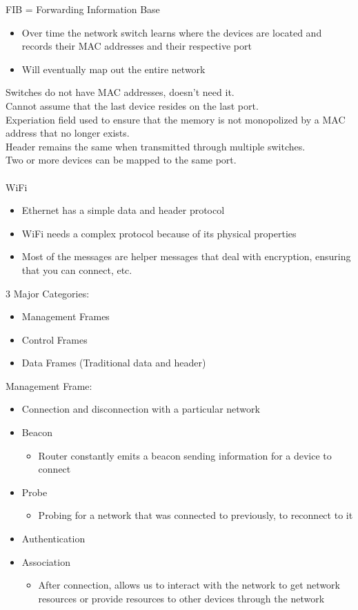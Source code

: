 \documentclass{article}
\begin{document}
FIB = Forwarding Information Base 
\begin{itemize}
    \item Over time the network switch learns where the devices are located and records their MAC addresses and their respective port
    \item Will eventually map out the entire network
\end{itemize}
Switches do not have MAC addresses, doesn't need it. \\ 
Cannot assume that the last device resides on the last port. \\
Experiation field used to ensure that the memory is not monopolized by a MAC address that no longer exists. \\
Header remains the same when transmitted through multiple switches. \\
Two or more devices can be mapped to the same port. \\ \\
WiFi
\begin{itemize}
    \item Ethernet has a simple data and header protocol
    \item WiFi needs a complex protocol because of its physical properties
    \item Most of the messages are helper messages that deal with encryption, ensuring that you can connect, etc.
\end{itemize}
3 Major Categories:
\begin{itemize}
    \item Management Frames
    \item Control Frames
    \item Data Frames (Traditional data and header)
\end{itemize}
Management Frame:
\begin{itemize}
    \item Connection and disconnection with a particular network
    \item Beacon 
    \begin{itemize}
        \item Router constantly emits a beacon sending information for a device to connect
    \end{itemize}
    \item Probe
    \begin{itemize}
        \item Probing for a network that was connected to previously, to reconnect to it
    \end{itemize}
    \item Authentication
    \item Association
    \begin{itemize}
        \item After connection, allows us to interact with the network to get network resources or provide resources to other devices through the network
    \end{itemize}
\end{itemize}
\end{document}
